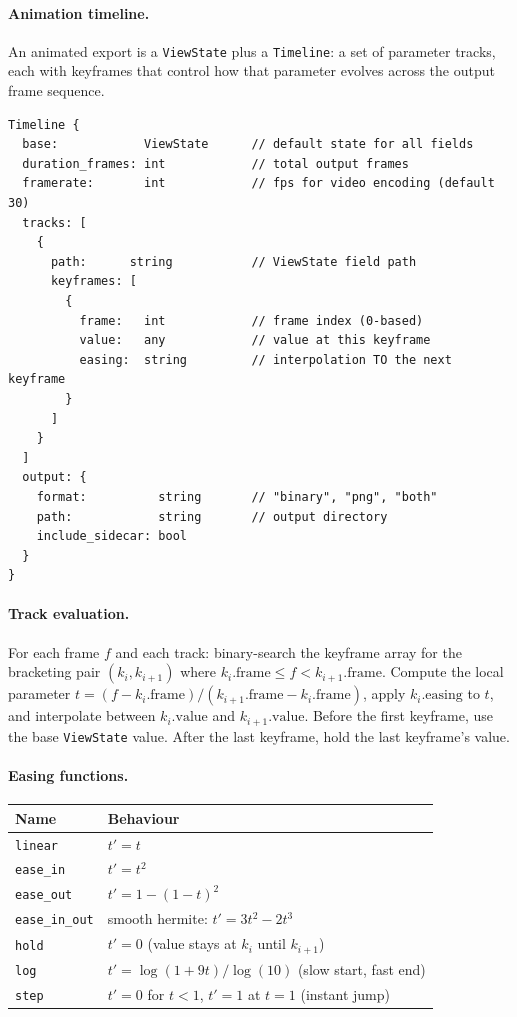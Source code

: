 \documentclass[11pt]{report}
\begin{document}
\paragraph{Animation timeline.} An animated export is a \texttt{ViewState} plus a \texttt{Timeline}: a set of parameter tracks, each with keyframes that control how that parameter evolves across the output frame sequence.
\begin{verbatim}
Timeline {
  base:            ViewState      // default state for all fields
  duration_frames: int            // total output frames
  framerate:       int            // fps for video encoding (default 30)
  tracks: [
    {
      path:      string           // ViewState field path
      keyframes: [
        {
          frame:   int            // frame index (0-based)
          value:   any            // value at this keyframe
          easing:  string         // interpolation TO the next keyframe
        }
      ]
    }
  ]
  output: {
    format:          string       // "binary", "png", "both"
    path:            string       // output directory
    include_sidecar: bool
  }
}
\end{verbatim}

\paragraph{Track evaluation.} For each frame $f$ and each track: binary-search the keyframe array for the bracketing pair $(k_i, k_{i+1})$ where $k_i.\mathrm{frame}\le f<k_{i+1}.\mathrm{frame}$. Compute the local parameter $t=(f-k_i.\mathrm{frame})/(k_{i+1}.\mathrm{frame}-k_i.\mathrm{frame})$, apply $k_i.\mathrm{easing}$ to $t$, and interpolate between $k_i.\mathrm{value}$ and $k_{i+1}.\mathrm{value}$. Before the first keyframe, use the base \texttt{ViewState} value. After the last keyframe, hold the last keyframe's value.

\paragraph{Easing functions.}
\begin{center}
\begin{tabular}{ll}
\toprule
Name & Behaviour \\
\midrule
\texttt{linear} & $t' = t$ \\
\texttt{ease\_in} & $t' = t^2$ \\
\texttt{ease\_out} & $t' = 1-(1-t)^2$ \\
\texttt{ease\_in\_out} & smooth hermite: $t' = 3t^2 - 2t^3$ \\
\texttt{hold} & $t' = 0$ (value stays at $k_i$ until $k_{i+1}$) \\
\texttt{log} & $t' = \log(1+9t)/\log(10)$ (slow start, fast end) \\
\texttt{step} & $t' = 0$ for $t<1$, $t' = 1$ at $t=1$ (instant jump) \\
\bottomrule
\end{tabular}
\end{center}
\end{document}
